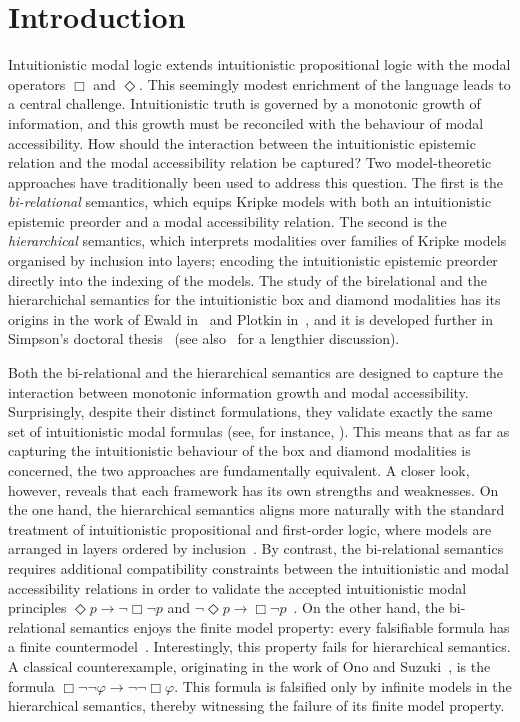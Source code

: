 \section{Introduction}
\label{sec:intro}

Intuitionistic modal logic extends intuitionistic propositional logic with the modal operators $\Box$ and $\Diamond$.
This seemingly modest enrichment of the language leads to a central challenge. Intuitionistic truth is governed by a monotonic growth of information, and this growth must be reconciled with the behaviour of modal accessibility. How should the interaction between the intuitionistic epistemic relation and the modal accessibility relation be captured?
Two model-theoretic approaches have traditionally been used to address this question. The first is the \emph{bi-relational} semantics, which equips Kripke models with both an intuitionistic epistemic preorder and a modal accessibility relation.
The second is the \emph{hierarchical} semantics, which interprets modalities over families of Kripke models organised by inclusion into layers; encoding the intuitionistic epistemic preorder directly into the indexing of the models.
%
The study of the birelational and the hierarchichal semantics for the intuitionistic box and diamond modalities has its origins in the work of Ewald in~\cite{ewald1986intuitionistic} and Plotkin in~\cite{PlotkinS86}, and it is developed further in Simpson's doctoral thesis~\cite{simpson1994} (see also~\cite{Wolter1999,gabbay2003many} for a lengthier discussion).

Both the bi-relational and the hierarchical semantics are designed to capture the interaction between monotonic information growth and modal accessibility. Surprisingly, despite their distinct formulations, they validate exactly the same set of intuitionistic modal formulas (see, for instance, \cite{simpson1994,gabbay2003many}).
This means that as far as capturing the intuitionistic behaviour of the box and diamond modalities is concerned, the two approaches are fundamentally equivalent.
%
A closer look, however, reveals that each framework has its own strengths and weaknesses.
%
On the one hand, the hierarchical semantics aligns more naturally with the standard treatment of intuitionistic propositional and first-order logic, where models are arranged in layers ordered by inclusion~\cite{Troelstra1988}. By contrast, the bi-relational semantics requires additional compatibility constraints between the intuitionistic and modal accessibility relations in order to validate the accepted intuitionistic modal principles $\Diamond p \to \lnot \Box \lnot p$ and $\lnot \Diamond p \to \Box\lnot p$~\cite{PlotkinS86}.
%
On the other hand, the bi-relational semantics enjoys the finite model property: every falsifiable formula has a finite countermodel~\cite{simpson1994}. Interestingly, this property fails for hierarchical semantics. A classical counterexample, originating in the work of Ono and Suzuki~\cite{ono1988}, is the formula $\Box \neg \neg \varphi \to \neg \neg \Box \varphi$. This formula is falsified only by infinite models in the hierarchical semantics, thereby witnessing the failure of its finite model property.

